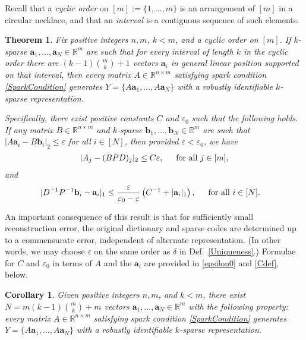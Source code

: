 \documentclass[journal, onecolumn]{IEEEtran}
\newtheorem{theorem}{Theorem}
\newtheorem{corollary}{Corollary}
\begin{document}
Recall that a \textit{cyclic order} on $[m] := \{1, \ldots,m\}$ is an arrangement of $[m]$ in a circular necklace, and that an \textit{interval} is a contiguous sequence of such elements.  %

\begin{theorem}\label{DeterministicUniquenessTheorem}
Fix positive integers $n, m$, $k < m$, and a cyclic order on $[m]$. If $k$-sparse $\mathbf{a}_1, \ldots, \mathbf{a}_N \in \mathbb{R}^m$ are such that for every interval of length $k$ in the cyclic order there are $(k-1){m \choose k}+1$ vectors $\mathbf{a}_i$ in general linear position supported on that interval, then every matrix $A \in \mathbb{R}^{n \times m}$ satisfying spark condition \eqref{SparkCondition} generates $Y = \{A\mathbf{a}_1, \ldots, A\mathbf{a}_N\}$ with a robustly identifiable $k$-sparse representation.

Specifically, there exist positive constants $C$ and $\varepsilon_0$ such that the following holds. If any matrix $B \in \mathbb{R}^{n \times m}$ and $k$-sparse $\mathbf{b}_1, \ldots, \mathbf{b}_N \in \mathbb{R}^m$ are such that $|A\mathbf{a}_i - B\mathbf{b}_i|_2 \leq \varepsilon$ for all $i \in [N]$, then provided $\varepsilon < \varepsilon_0$, we have
\begin{align}\label{Cstable}
|A_j-(BPD)_j|_2 \leq C\varepsilon,\indent  \text{for all } j \in [m],
\end{align}
and 
\begin{align}\label{b-PDa}
|D^{-1}P^{-1}\mathbf{b}_i - \mathbf{a}_i|_1 &\leq \frac{\varepsilon }{\varepsilon_0 - \varepsilon} \left( C^{-1}+|\mathbf{a}_i|_1 \right),\indent  \text{for all } i \in [N].
\end{align}
\end{theorem}
An important consequence of this result is that for sufficiently small reconstruction error, the original dictionary and sparse codes are determined up to a commensurate error, independent of alternate representation.  (In other words, we may choose $\varepsilon$ on the same order as $\delta$ in Def.~\ref{Uniqueness}.) Formulae for  $C$ and $\varepsilon_0$ in terms of $A$ and the $\mathbf{a}_i$ are provided in \eqref{epsilon0} and \eqref{Cdef}, below. 

\begin{corollary}\label{DeterministicUniquenessCorollary}
Given positive integers $n, m$, and $k < m$, there exist $N =  m(k-1){m \choose k}+m$ vectors $\mathbf{a}_1, \ldots, \mathbf{a}_N \in \mathbb{R}^m$ with the following property: every matrix $A \in \mathbb{R}^{n \times m}$ satisfying spark condition \eqref{SparkCondition} generates $Y = \{A\mathbf{a}_1, \ldots, A\mathbf{a}_N\}$ with a robustly identifiable $k$-sparse representation.
\end{corollary}
\end{document}
